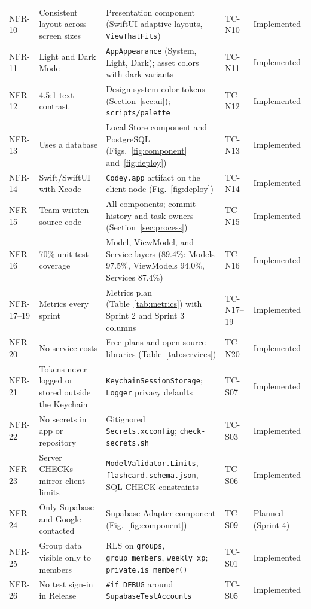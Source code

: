 \documentclass[12pt,letterpaper]{article}
\begin{document}
\begin{xltabular}{\textwidth}{@{}l L{3.2cm} Y l L{2.6cm}@{}}
NFR-10 & Consistent layout across screen sizes & Presentation component (SwiftUI adaptive layouts, \texttt{ViewThatFits}) & TC-N10 & Implemented \\
NFR-11 & Light and Dark Mode & \texttt{AppAppearance} (System, Light, Dark); asset colors with dark variants & TC-N11 & Implemented \\
NFR-12 & 4.5:1 text contrast & Design-system color tokens (Section~\ref{sec:ui}); \texttt{scripts/palette} & TC-N12 & Implemented \\
NFR-13 & Uses a database & Local Store component and PostgreSQL (Figs.~\ref{fig:component} and~\ref{fig:deploy}) & TC-N13 & Implemented \\
NFR-14 & Swift/SwiftUI with Xcode & \texttt{Codey.app} artifact on the client node (Fig.~\ref{fig:deploy}) & TC-N14 & Implemented \\
NFR-15 & Team-written source code & All components; commit history and task owners (Section~\ref{sec:process}) & TC-N15 & Implemented \\
NFR-16 & 70\% unit-test coverage & Model, ViewModel, and Service layers (89.4\%: Models 97.5\%, ViewModels 94.0\%, Services 87.4\%) & TC-N16 & Implemented \\
NFR-17--19 & Metrics every sprint & Metrics plan (Table~\ref{tab:metrics}) with Sprint 2 and Sprint 3 columns & TC-N17--19 & Implemented \\
NFR-20 & No service costs & Free plans and open-source libraries (Table~\ref{tab:services}) & TC-N20 & Implemented \\
NFR-21 & Tokens never logged or stored outside the Keychain & \texttt{KeychainSessionStorage}; \texttt{Logger} privacy defaults & TC-S07 & Implemented \\
NFR-22 & No secrets in app or repository & Gitignored \texttt{Secrets.xcconfig}; \texttt{check-secrets.sh} & TC-S03 & Implemented \\
NFR-23 & Server CHECKs mirror client limits & \texttt{ModelValidator.Limits}, \texttt{flashcard.schema.json}, SQL CHECK constraints & TC-S06 & Implemented \\
NFR-24 & Only Supabase and Google contacted & Supabase Adapter component (Fig.~\ref{fig:component}) & TC-S09 & Planned (Sprint 4) \\
NFR-25 & Group data visible only to members & RLS on \texttt{groups}, \texttt{group\_members}, \texttt{weekly\_xp}; \texttt{private.is\_member()} & TC-S01 & Implemented \\
NFR-26 & No test sign-in in Release & \texttt{\#if DEBUG} around \texttt{SupabaseTestAccounts} & TC-S05 & Implemented \\

\end{xltabular}
\end{document}
